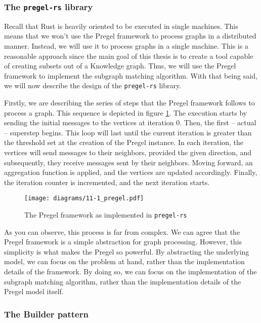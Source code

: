 \subsubsection{The \texttt{pregel-rs} library}

Recall that Rust is heavily oriented to be executed in single machines. This means that we won't use the Pregel framework to process graphs in a distributed manner. Instead, we will use it to process graphs in a single machine. This is a reasonable approach since the main goal of this thesis is to create a tool capable of creating subsets out of a Knowledge graph. Thus, we will use the Pregel framework to implement the subgraph matching algorithm. With that being said, we will now describe the design of the \texttt{pregel-rs} library.

Firstly, we are describing the series of steps that the Pregel framework follows to process a graph. This sequence is depicted in figure \ref{fig:sequence}. The execution starts by sending the initial messages to the vertices at iteration 0. Then, the first -- actual -- superstep begins. This loop will last until the current iteration is greater than the threshold set at the creation of the Pregel instance. In each iteration, the vertices will send messages to their neighbors, provided the given direction, and subsequently, they receive messages sent by their neighbors. Moving forward, an aggregation function is applied, and the vertices are updated accordingly. Finally, the iteration counter is incremented, and the next iteration starts.

\begin{figure}[ht]
    \centering
    \texttt{[image: diagrams/11-1\_pregel.pdf]}
    \label{fig:sequence}
    \caption{The Pregel framework as implemented in \texttt{pregel-rs}}
\end{figure}

As you can observe, this process is far from complex. We can agree that the Pregel framework is a simple abstraction for graph processing. However, this simplicity is what makes the Pregel so powerful. By abstracting the underlying model, we can focus on the problem at hand, rather than the implementation details of the framework. By doing so, we can focus on the implementation of the subgraph matching algorithm, rather than the implementation details of the Pregel model itself.

\subsubsection{The Builder pattern}

